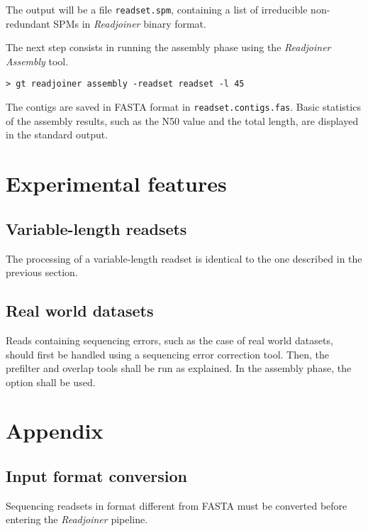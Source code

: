 \documentclass[12pt,titlepage]{article}
\newcommand{\Readjoiner}{\textit{Readjoiner}\xspace}
\newcommand{\Rdjassembly}{\textit{Readjoiner Assembly}\xspace}
\begin{document}
The output will be a file \texttt{readset.spm}, containing
a list of irreducible non-redundant SPMs in \Readjoiner binary format.

The next step consists in running the assembly phase using the
\Rdjassembly tool.

\begin{footnotesize}
\begin{verbatim}
> gt readjoiner assembly -readset readset -l 45
\end{verbatim}
\end{footnotesize}

The contigs are saved in FASTA format in \texttt{readset.contigs.fas}.
Basic statistics of the assembly results, such as the N50 value
and the total length, are displayed in the standard output.

\section{Experimental features}

\subsection{Variable-length readsets}

The processing of a variable-length readset is identical to the one described
in the previous section.

\subsection{Real world datasets}

Reads containing sequencing errors, such as the case of real world datasets,
should first be handled using a sequencing error correction tool.
Then, the prefilter and overlap tools shall be run as explained.
In the assembly phase, the  option shall be used.

\section{Appendix}

\subsection{Input format conversion}
\label{nonfastainput}

Sequencing readsets in format different from FASTA must be converted before
entering the \Readjoiner pipeline.
\end{document}
